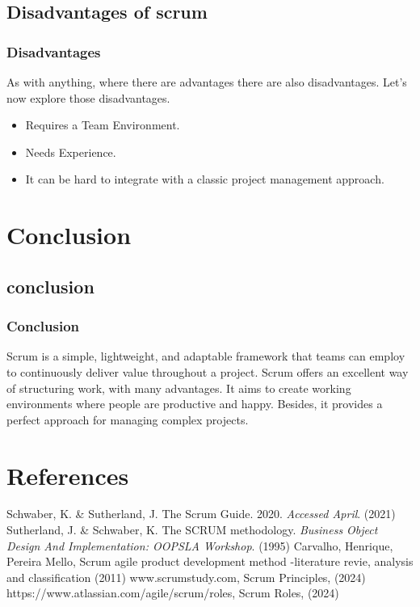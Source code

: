 \documentclass[
	11pt, %
]{beamer}
\begin{document}
\subsection{Disadvantages of scrum}
\begin{frame}
	\frametitle{Disadvantages}
	As with anything, where there are advantages there are also disadvantages. Let's now explore those disadvantages.
	\\
	\begin{itemize}
			\item Requires a Team Environment.
			\item Needs Experience.
			\item  It can be hard to integrate with a classic project management approach.
	\end{itemize}
\end{frame}


\section{Conclusion}
\subsection{conclusion}

\begin{frame}
	\frametitle{Conclusion}
	Scrum is a simple, lightweight, and adaptable framework that 
	teams can employ to continuously deliver value throughout a project.
	Scrum offers an excellent way of structuring work, with many advantages.
	It aims to create working environments where people are productive and happy.
	Besides, it provides a perfect approach for managing complex projects.
\end{frame}

\section{References}

\begin{frame}[allowframebreaks] %
	\begin{thebibliography}{91}
		Schwaber, K. \& Sutherland, J. The Scrum Guide. 2020. {\em Accessed April}. (2021)
        Sutherland, J. \& Schwaber, K. The SCRUM methodology. {\em Business Object Design And Implementation: OOPSLA Workshop}. (1995)
		Carvalho, Henrique, Pereira Mello, Scrum agile product development 
		method -literature revie, analysis and classification (2011)
		 www.scrumstudy.com, Scrum Principles, (2024)
		 https://www.atlassian.com/agile/scrum/roles, Scrum Roles, (2024)
	\end{thebibliography}
\end{frame}
\end{document}
